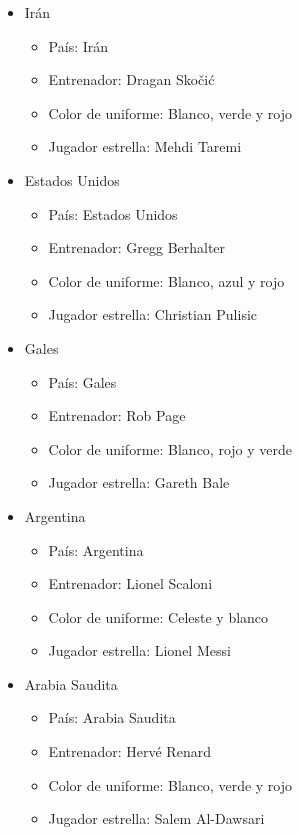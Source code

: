 \begin{itemize}
\begin{itemize}
        \end{itemize}
    \item Irán
        \begin{itemize}
            \item País: Irán
            \item Entrenador: Dragan Skočić
            \item Color de uniforme: Blanco, verde y rojo
            \item Jugador estrella: Mehdi Taremi
        \end{itemize}
    \item Estados Unidos
        \begin{itemize}
            \item País: Estados Unidos
            \item Entrenador: Gregg Berhalter
            \item Color de uniforme: Blanco, azul y rojo
            \item Jugador estrella: Christian Pulisic
        \end{itemize}
    \item Gales
        \begin{itemize}
            \item País: Gales
            \item Entrenador: Rob Page
            \item Color de uniforme: Blanco, rojo y verde
            \item Jugador estrella: Gareth Bale
        \end{itemize}
    \item Argentina
        \begin{itemize}
            \item País: Argentina
            \item Entrenador: Lionel Scaloni
            \item Color de uniforme: Celeste y blanco
            \item Jugador estrella: Lionel Messi
        \end{itemize}
    \item Arabia Saudita
        \begin{itemize}
            \item País: Arabia Saudita
            \item Entrenador: Hervé Renard
            \item Color de uniforme: Blanco, verde y rojo
            \item Jugador estrella: Salem Al-Dawsari

\end{itemize}
\end{itemize}
